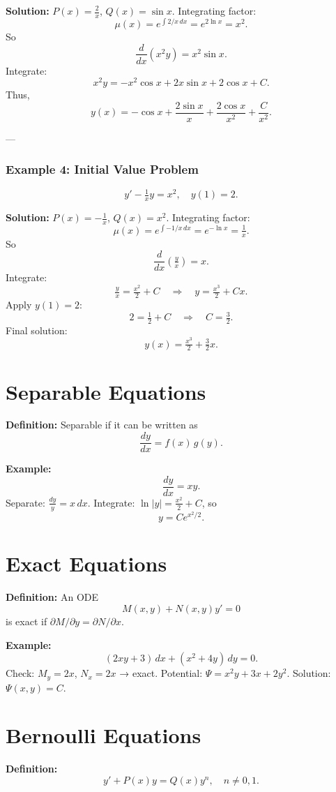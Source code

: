\documentclass[12pt]{book}
\begin{document}
\textbf{Solution:} $P(x) = \tfrac{2}{x}$, $Q(x)=\sin x$.  
Integrating factor:
\[
\mu(x) = e^{\int 2/x \, dx} = e^{2\ln x} = x^2.
\]
So
\[
\frac{d}{dx}(x^2 y) = x^2 \sin x.
\]
Integrate:
\[
x^2 y = -x^2 \cos x + 2x \sin x + 2\cos x + C.
\]
Thus,
\[
y(x) = -\cos x + \frac{2\sin x}{x} + \frac{2\cos x}{x^2} + \frac{C}{x^2}.
\]

---

\subsection*{Example 4: Initial Value Problem}
\[
y' - \tfrac{1}{x}y = x^2, \quad y(1) = 2.
\]

\textbf{Solution:} $P(x)=-\tfrac{1}{x}$, $Q(x)=x^2$.  
Integrating factor:
\[
\mu(x) = e^{\int -1/x \, dx} = e^{-\ln x} = \tfrac{1}{x}.
\]
So
\[
\frac{d}{dx}\!\left(\tfrac{y}{x}\right) = x.
\]
Integrate:
\[
\tfrac{y}{x} = \tfrac{x^2}{2} + C \quad\Longrightarrow\quad y = \tfrac{x^3}{2} + Cx.
\]
Apply $y(1)=2$:
\[
2 = \tfrac{1}{2} + C \quad\Rightarrow\quad C = \tfrac{3}{2}.
\]
Final solution:
\[
y(x) = \tfrac{x^3}{2} + \tfrac{3}{2}x.
\]


\chapter{Separable Equations}
\textbf{Definition:} Separable if it can be written as
\[
\frac{dy}{dx} = f(x)\,g(y).
\]

\textbf{Example:}
\[
\frac{dy}{dx} = xy.
\]
Separate: \(\frac{dy}{y} = x\,dx\). Integrate:
\(\ln|y| = \tfrac{x^2}{2} + C\), so
\[
y = Ce^{x^2/2}.
\]

\chapter{Exact Equations}
\textbf{Definition:} An ODE
\[
M(x,y) + N(x,y)y' = 0
\]
is exact if \(\partial M/\partial y = \partial N/\partial x\).

\textbf{Example:}
\[
(2xy + 3)\,dx + (x^2 + 4y)\,dy = 0.
\]
Check: \(M_y = 2x\), \(N_x = 2x\) → exact.  
Potential: \(\Psi = x^2y + 3x + 2y^2\).  
Solution: \(\Psi(x,y) = C\).

\chapter{Bernoulli Equations}
\textbf{Definition:}
\[
y' + P(x)y = Q(x) y^n, \quad n \neq 0,1.
\]
\end{document}
